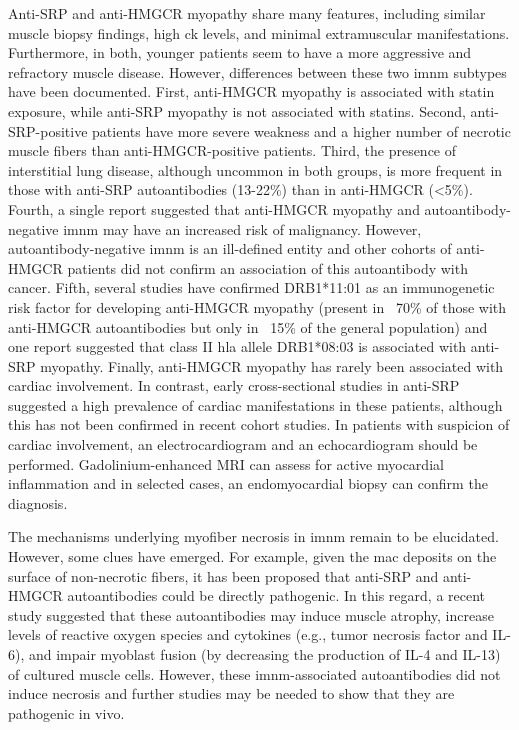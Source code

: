 Anti-SRP and anti-HMGCR myopathy share many features, including similar muscle biopsy findings, high \gls{ck} levels, and minimal extramuscular manifestations.\cite{Watanabe2016} Furthermore, in both, younger patients seem to have a more aggressive and refractory muscle disease.\cite{PinalFernandez2017b,Tiniakou2017} However, differences between these two \gls{imnm} subtypes have been documented. First, anti-HMGCR myopathy is associated with statin exposure,\cite{ChristopherStine2010} while anti-SRP myopathy is not associated with statins.\cite{PinalFernandez2017b,Suzuki2015} Second, anti-SRP-positive patients have more severe weakness and a higher number of necrotic muscle fibers than anti-HMGCR-positive patients.\cite{PinalFernandez2017b,Watanabe2016,Allenbach2018} Third, the presence of interstitial lung disease, although uncommon in both groups, is more frequent in those with anti-SRP autoantibodies (13-22\%) than in anti-HMGCR (<5\%).\cite{PinalFernandez2017b,Suzuki2015,Watanabe2016,Tiniakou2017} Fourth, a single report suggested that anti-HMGCR myopathy and autoantibody-negative \gls{imnm} may have an increased risk of malignancy.\cite{Allenbach2016} However, autoantibody-negative \gls{imnm} is an ill-defined entity and other cohorts of anti-HMGCR patients did not confirm an association of this autoantibody with cancer.\cite{Tiniakou2017,Watanabe2016} Fifth, several studies have confirmed DRB1*11:01 as an immunogenetic risk factor for developing anti-HMGCR myopathy (present in ~70\% of those with anti-HMGCR autoantibodies but only in ~15\% of the general population) and one report suggested that class II \gls{hla} allele DRB1*08:03 is associated with anti-SRP myopathy.\cite{Ohnuki2016,Mammen2012,Limaye2015} Finally, anti-HMGCR myopathy has rarely been associated with cardiac involvement.\cite{Watanabe2016} In contrast, early cross-sectional studies in anti-SRP suggested a high prevalence of cardiac manifestations in these patients,\cite{Targoff1990,Kao2004} although this has not been confirmed in recent cohort studies.\cite{PinalFernandez2017b,Suzuki2015,Watanabe2016} In patients with suspicion of cardiac involvement, an electrocardiogram and an echocardiogram should be performed. Gadolinium-enhanced MRI can assess for active myocardial inflammation and in selected cases, an endomyocardial biopsy can confirm the diagnosis.\cite{Chen2018}

The mechanisms underlying myofiber necrosis in \gls{imnm} remain to be elucidated. However, some clues have emerged. For example, given the \gls{mac} deposits on the surface of non-necrotic fibers, it has been proposed that anti-SRP and anti-HMGCR autoantibodies could be directly pathogenic.\cite{Allenbach2018} In this regard, a recent study suggested that these autoantibodies may induce muscle atrophy, increase levels of reactive oxygen species and cytokines (e.g., tumor necrosis factor and IL-6), and impair myoblast fusion (by decreasing the production of IL-4 and IL-13) of cultured muscle cells.\cite{AroucheDelaperche2017} However, these \gls{imnm}-associated autoantibodies did not induce necrosis and further studies may be needed to show that they are pathogenic in vivo.\cite{AroucheDelaperche2017}

